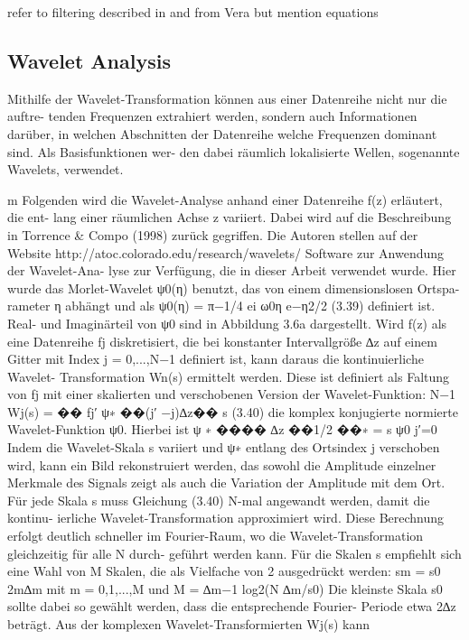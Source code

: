 refer to filtering described in \cite{Kruse} and from Vera
but mention equations

\subsection{Wavelet Analysis}


Mithilfe der Wavelet-Transformation können aus einer Datenreihe nicht nur die auftre- tenden Frequenzen extrahiert werden, sondern auch Informationen darüber, in welchen Abschnitten der Datenreihe welche Frequenzen dominant sind. Als Basisfunktionen wer- den dabei räumlich lokalisierte Wellen, sogenannte Wavelets, verwendet.

m Folgenden wird die Wavelet-Analyse anhand einer Datenreihe f(z) erläutert, die ent- lang einer räumlichen Achse z variiert. Dabei wird auf die Beschreibung in Torrence & Compo (1998) zurück gegriffen. Die Autoren stellen auf der Website http://atoc.colorado.edu/research/wavelets/ Software zur Anwendung der Wavelet-Ana- lyse zur Verfügung, die in dieser Arbeit verwendet wurde.
Hier wurde das Morlet-Wavelet ψ0(η) benutzt, das von einem dimensionslosen Ortspa- rameter η abhängt und als
ψ0(η) = π−1/4 ei ω0η e−η2/2 (3.39)
definiert ist. Real- und Imaginärteil von ψ0 sind in Abbildung 3.6a dargestellt. Wird f(z) als eine Datenreihe fj diskretisiert, die bei konstanter Intervallgröße ∆z auf einem Gitter mit Index j = 0,...,N−1 definiert ist, kann daraus die kontinuierliche Wavelet- Transformation Wn(s) ermittelt werden. Diese ist definiert als Faltung von fj mit einer skalierten und verschobenen Version der Wavelet-Funktion:
N−1 Wj(s) = �� fj′ ψ∗
��(j′ −j)∆z�� s
(3.40) die komplex konjugierte normierte Wavelet-Funktion ψ0.
 Hierbei ist ψ
∗
���� ∆z ��1/2 ��∗ = s ψ0
j′=0
 Indem die Wavelet-Skala s variiert und ψ∗ entlang des Ortsindex j verschoben wird, kann ein Bild rekonstruiert werden, das sowohl die Amplitude einzelner Merkmale des Signals zeigt als auch die Variation der Amplitude mit dem Ort.
Für jede Skala s muss Gleichung (3.40) N-mal angewandt werden, damit die kontinu- ierliche Wavelet-Transformation approximiert wird. Diese Berechnung erfolgt deutlich schneller im Fourier-Raum, wo die Wavelet-Transformation gleichzeitig für alle N durch- geführt werden kann. Für die Skalen s empfiehlt sich eine Wahl von M Skalen, die als Vielfache von 2 ausgedrückt werden:
sm = s0 2m∆m mit m = 0,1,...,M und M = ∆m−1 log2(N ∆m/s0)
Die kleinste Skala s0 sollte dabei so gewählt werden, dass die entsprechende Fourier-
Periode etwa 2∆z beträgt. Aus der komplexen Wavelet-Transformierten Wj(s) kann
